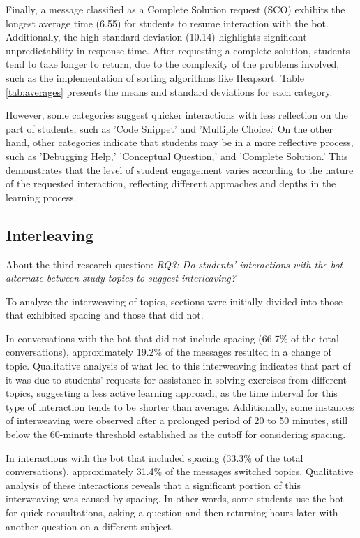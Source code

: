 \documentclass[a4paper,twoside]{article}
\begin{document}
Finally, a message classified as a Complete Solution request (SCO) exhibits the
longest average time (6.55) for students to resume interaction with the bot.
Additionally, the high standard deviation (10.14) highlights significant
unpredictability in response time. After requesting a complete solution,
students tend to take longer to return, due to the complexity of the problems
involved, such as the implementation of sorting algorithms like Heapsort. Table
\ref{tab:averages} presents the means and standard deviations for each
category.

However, some categories suggest quicker interactions with less reflection on
the part of students, such as 'Code Snippet' and 'Multiple Choice.' On the other
hand, other categories indicate that students may be in a more reflective
process, such as 'Debugging Help,' 'Conceptual Question,' and 'Complete
Solution.' This demonstrates that the level of student engagement varies
according to the nature of the requested interaction, reflecting different
approaches and depths in the learning process.

\subsection{Interleaving}

About the third research question: \textit{RQ3: Do students' interactions with
the bot alternate between study topics to suggest interleaving?}

To analyze the interweaving of topics, sections were initially divided into
those that exhibited spacing and those that did not.

In conversations with the bot that did not include spacing (66.7\% of the total
conversations), approximately 19.2\% of the messages resulted in a change of
topic. Qualitative analysis of what led to this interweaving indicates that
part of it was due to students' requests for assistance in solving exercises
from different topics, suggesting a less active learning approach, as the time
interval for this type of interaction tends to be shorter than average.
Additionally, some instances of interweaving were observed after a prolonged
period of 20 to 50 minutes, still below the 60-minute threshold established as
the cutoff for considering spacing.

In interactions with the bot that included spacing (33.3\% of the total
conversations), approximately 31.4\% of the messages switched topics.
Qualitative analysis of these interactions reveals that a significant portion
of this interweaving was caused by spacing. In other words, some students use
the bot for quick consultations, asking a question and then returning hours
later with another question on a different subject.
\end{document}
